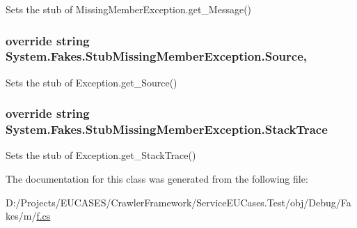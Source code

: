 Sets the stub of Missing\-Member\-Exception.\-get\-\_\-\-Message()

\hypertarget{class_system_1_1_fakes_1_1_stub_missing_member_exception_a953ee210396eac9dd64cd554d87f422b}{
\subsubsection[{Source}]{\setlength{\rightskip}{0pt plus 5cm}override string System.\-Fakes.\-Stub\-Missing\-Member\-Exception.\-Source\hspace{0.3cm}{\ttfamily [get]}, {\ttfamily [set]}}}\label{class_system_1_1_fakes_1_1_stub_missing_member_exception_a953ee210396eac9dd64cd554d87f422b}


Sets the stub of Exception.\-get\-\_\-\-Source()

\hypertarget{class_system_1_1_fakes_1_1_stub_missing_member_exception_a11403c1ee83ac74ede261d144a082d8c}{
\subsubsection[{Stack\-Trace}]{\setlength{\rightskip}{0pt plus 5cm}override string System.\-Fakes.\-Stub\-Missing\-Member\-Exception.\-Stack\-Trace\hspace{0.3cm}{\ttfamily [get]}}}\label{class_system_1_1_fakes_1_1_stub_missing_member_exception_a11403c1ee83ac74ede261d144a082d8c}


Sets the stub of Exception.\-get\-\_\-\-Stack\-Trace()



The documentation for this class was generated from the following file\-:\begin{DoxyCompactItemize}
\item 
D\-:/\-Projects/\-E\-U\-C\-A\-S\-E\-S/\-Crawler\-Framework/\-Service\-E\-U\-Cases.\-Test/obj/\-Debug/\-Fakes/m/\hyperlink{m_2f_8cs}{f.\-cs}\end{DoxyCompactItemize}
